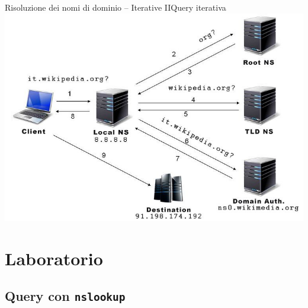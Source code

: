 \documentclass[italian]{beamer}
\begin{document}
\begin{frame}{Risoluzione dei nomi di dominio -- Iterative II}{Query iterativa}
\centering\includegraphics[height=0.8\textheight]{img/dns-risoluzione-iterativa}
\end{frame}
\section{Laboratorio}

\subsection[Lab 1: nslookup]{Query con \texttt{nslookup}}
\end{document}
